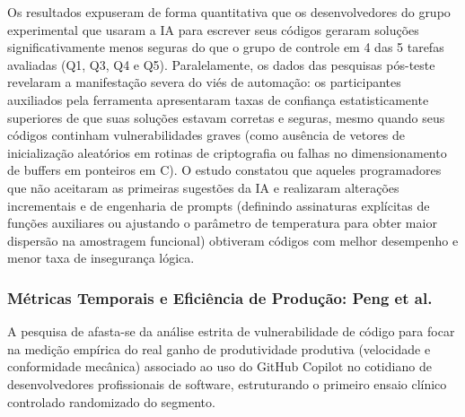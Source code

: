 Os resultados expuseram de forma quantitativa que os desenvolvedores do grupo experimental que usaram a IA para escrever seus códigos geraram soluções significativamente menos seguras do que o grupo de controle em 4 das 5 tarefas avaliadas (Q1, Q3, Q4 e Q5). Paralelamente, os dados das pesquisas pós-teste revelaram a manifestação severa do viés de automação: os participantes auxiliados pela ferramenta apresentaram taxas de confiança estatisticamente superiores de que suas soluções estavam corretas e seguras, mesmo quando seus códigos continham vulnerabilidades graves (como ausência de vetores de inicialização aleatórios em rotinas de criptografia ou falhas no dimensionamento de buffers em ponteiros em C). O estudo constatou que aqueles programadores que não aceitaram as primeiras sugestões da IA e realizaram alterações incrementais e de engenharia de prompts (definindo assinaturas explícitas de funções auxiliares ou ajustando o parâmetro de temperatura para obter maior dispersão na amostragem funcional) obtiveram códigos com melhor desempenho e menor taxa de insegurança lógica.

\subsubsection{Métricas Temporais e Eficiência de Produção: Peng et al. \cite{peng2023}}

A pesquisa de  afasta-se da análise estrita de vulnerabilidade de código para focar na medição empírica do real ganho de produtividade produtiva (velocidade e conformidade mecânica) associado ao uso do GitHub Copilot no cotidiano de desenvolvedores profissionais de software, estruturando o primeiro ensaio clínico controlado randomizado do segmento.

